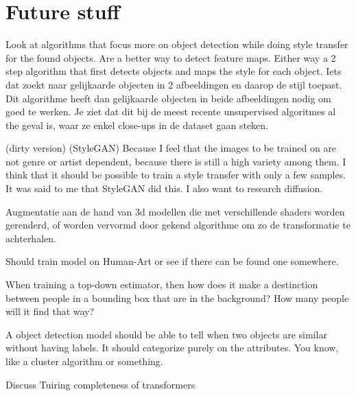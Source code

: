 \chapter{Future stuff}
Look at algorithms that focus more on object detection while doing style transfer for the found objects.
Are a better way to detect feature maps.
Either way a 2 step algorithm that first detects objects and maps the style for each object.
Iets dat zoekt naar gelijkaarde objecten in 2 afbeeldingen en daarop de stijl toepast.
Dit algorithme heeft dan gelijkaarde objecten in beide afbeeldingen nodig om goed te werken.
Je ziet dat dit bij de meest recente unsupervised algoritmes al the geval is, waar ze enkel close-ups in de dataset gaan steken.


(dirty version)
(StyleGAN) Because I feel that the images to be trained on are not genre or artist dependent, because there is still a high variety among them.
I think that it should be possible to train a style transfer with only a few samples.
It was said to me that StyleGAN did this.
I also want to research diffusion.

Augmentatie aan de hand van 3d modellen die met verschillende shaders worden gerenderd, of worden vervormd door gekend algorithme om zo de transformatie te achterhalen.

Should train model on Human-Art or see if there can be found one somewhere.

When training a top-down estimator, then how does it make a destinction between people in a bounding box that are in the background?
How many people will it find that way?

A object detection model should be able to tell when two objects are similar without having labels.
It should categorize purely on the attributes.
You know, like a cluster algorithm or something.



Discuss Tuiring completeness of transformers